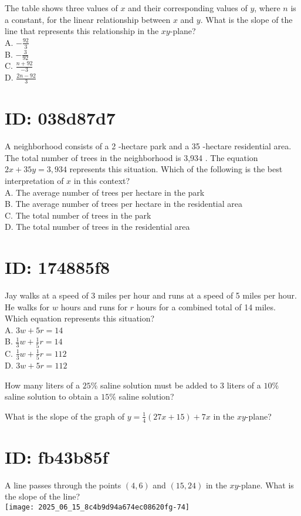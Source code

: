 The table shows three values of $x$ and their corresponding values of $y$, where $n$ is a constant, for the linear relationship between $x$ and $y$. What is the slope of the line that represents this relationship in the $x y$-plane?\\
A. $-\frac{92}{3}$\\
B. $-\frac{3}{92}$\\
C. $\frac{n+92}{-3}$\\
D. $\frac{2 n-92}{3}$

\section*{ID: 038d87d7}
A neighborhood consists of a 2 -hectare park and a 35 -hectare residential area. The total number of trees in the neighborhood is 3,934 . The equation $2 x+35 y=3,934$ represents this situation. Which of the following is the best interpretation of $x$ in this context?\\
A. The average number of trees per hectare in the park\\
B. The average number of trees per hectare in the residential area\\
C. The total number of trees in the park\\
D. The total number of trees in the residential area

\section*{ID: 174885f8}
Jay walks at a speed of 3 miles per hour and runs at a speed of 5 miles per hour. He walks for $w$ hours and runs for $r$ hours for a combined total of 14 miles. Which equation represents this situation?\\
A. $3 w+5 r=14$\\
B. $\frac{1}{3} w+\frac{1}{5} r=14$\\
C. $\frac{1}{3} w+\frac{1}{5} r=112$\\
D. $3 w+5 r=112$

How many liters of a $25 \%$ saline solution must be added to 3 liters of a $10 \%$ saline solution to obtain a $15 \%$ saline solution?

What is the slope of the graph of $y=\frac{1}{4}(27 x+15)+7 x$ in the $x y$-plane?

\section*{ID: fb43b85f}
A line passes through the points $(4,6)$ and $(15,24)$ in the $x y$-plane. What is the slope of the line?\\
\texttt{[image: 2025\_06\_15\_8c4b9d94a674ec08620fg-74]}

